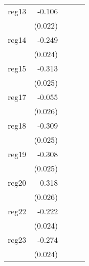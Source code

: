 {\begin{longtable}{l*{4}{D{.}{.}{-1}}}
\addlinespace
reg13       &      -0.106\sym{***}&                     &                     &                     \\
            &     (0.022)         &                     &                     &                     \\
\addlinespace
reg14       &      -0.249\sym{***}&                     &                     &                     \\
            &     (0.024)         &                     &                     &                     \\
\addlinespace
reg15       &      -0.313\sym{***}&                     &                     &                     \\
            &     (0.025)         &                     &                     &                     \\
\addlinespace
reg17       &      -0.055\sym{*}  &                     &                     &                     \\
            &     (0.026)         &                     &                     &                     \\
\addlinespace
reg18       &      -0.309\sym{***}&                     &                     &                     \\
            &     (0.025)         &                     &                     &                     \\
\addlinespace
reg19       &      -0.308\sym{***}&                     &                     &                     \\
            &     (0.025)         &                     &                     &                     \\
\addlinespace
reg20       &       0.318\sym{***}&                     &                     &                     \\
            &     (0.026)         &                     &                     &                     \\
\addlinespace
reg22       &      -0.222\sym{***}&                     &                     &                     \\
            &     (0.024)         &                     &                     &                     \\
\addlinespace
reg23       &      -0.274\sym{***}&                     &                     &                     \\
            &     (0.024)         &                     &                     &                     \\

\end{longtable}}

